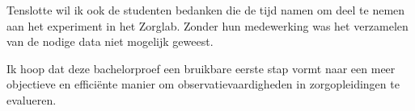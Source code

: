 Tenslotte wil ik ook de studenten bedanken die de tijd namen om deel te nemen aan het experiment in het Zorglab. 
Zonder hun medewerking was het verzamelen van de nodige data niet mogelijk geweest.

Ik hoop dat deze bachelorproef een bruikbare eerste stap vormt naar een meer objectieve en efficiënte manier om observatievaardigheden in zorgopleidingen te evalueren.